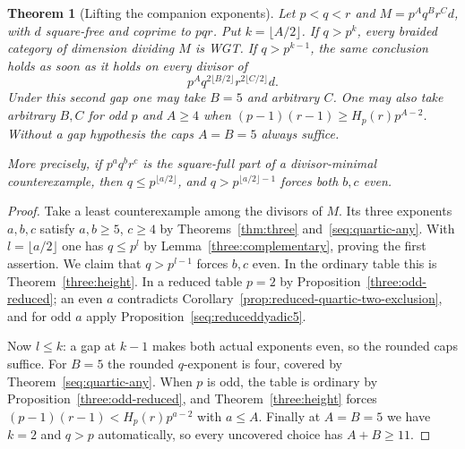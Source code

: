\documentclass[11pt,a4paper]{article}
\numberwithin{equation}{section}
\newtheorem{theorem}{Theorem}[section]
\theoremstyle{remark}
\begin{document}
\begin{theorem}[Lifting the companion exponents]\label{fam:M:7.11}\label{three:least-height}\label{three:unrestricted-middle}\label{three:excess}\label{seq:quintic-any}
Let $p<q<r$ and $M=p^Aq^Br^C d$, with $d$ square-free and coprime
to $pqr$. Put $k=\lfloor A/2\rfloor$. If $q>p^k$, every braided
category of dimension dividing $M$ is WGT. If $q>p^{k-1}$, the same
conclusion holds as soon as it holds on every divisor of
\[
                 p^A q^{2\lfloor B/2\rfloor}r^{2\lfloor C/2\rfloor}d.
\]
Under this second gap one may take $B=5$ and arbitrary $C$.
One may also take arbitrary $B,C$ for odd $p$ and $A\ge4$ when
$(p-1)(r-1)\ge H_p(r)p^{A-2}$. Without a gap hypothesis the
caps $A=B=5$ always suffice.

More precisely, if $p^aq^br^c$ is the square-full part of a
divisor-minimal counterexample, then
$q\le p^{\lfloor a/2\rfloor}$, and $q>p^{\lfloor a/2\rfloor-1}$
forces both $b,c$ even.
\end{theorem}
\begin{proof}
Take a least counterexample among the divisors of $M$. Its three
exponents $a,b,c$ satisfy $a,b\ge5$, $c\ge4$ by
Theorems~\ref{thm:three} and~\ref{seq:quartic-any}. With
$l=\lfloor a/2\rfloor$ one has $q\le p^l$ by
Lemma~\ref{three:complementary}, proving the first assertion.
We claim that $q>p^{l-1}$ forces $b,c$ even. In the ordinary table
this is Theorem~\ref{three:height}. In a reduced table $p=2$ by
Proposition~\ref{three:odd-reduced}; an even $a$ contradicts
Corollary~\ref{prop:reduced-quartic-two-exclusion}, and for odd $a$
apply Proposition~\ref{seq:reduceddyadic5}.

Now $l\le k$: a gap at $k-1$ makes both actual exponents even, so
the rounded caps suffice. For $B=5$ the rounded $q$-exponent is
four, covered by Theorem~\ref{seq:quartic-any}. When $p$ is odd,
the table is ordinary by Proposition~\ref{three:odd-reduced}, and
Theorem~\ref{three:height} forces $(p-1)(r-1)<H_p(r)p^{a-2}$
with $a\le A$. Finally at $A=B=5$ we have $k=2$ and $q>p$
automatically, so every uncovered choice has $A+B\ge11$.
\end{proof}
\end{document}
